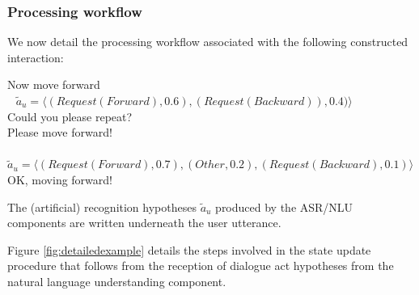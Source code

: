 \subsubsection*{Processing workflow}

We now detail the processing workflow associated with the following constructed interaction:
\begin{dialogue} 
 Now move forward \\ $\phantom{b}$ $\tilde{a}_u = \langle (\mathit{Request(Forward)}, 0.6), (\mathit{Request(Backward)}), 0.4)\rangle$  \\[-3mm]
 Could you please repeat? \\[-3mm]
 Please move forward! \\ $\phantom{b}$ $\tilde{a}_u = \langle (\mathit{Request(Forward)}, 0.7), (\mathit{Other}, 0.2), (\mathit{Request(Backward)}, 0.1) \rangle$ \\[-3mm]
 OK, moving forward!
\end{dialogue}
The (artificial) recognition hypotheses $\tilde{a}_u$ produced by the ASR/NLU components are written underneath the user utterance. 

Figure \ref{fig:detailedexample} details the steps involved in the state update procedure that follows from the reception of dialogue act hypotheses from the natural language understanding component. 


